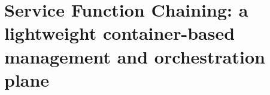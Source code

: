 \makeatletter
\newcommand{\unchapter}[1]{%
  \begingroup
  \let\@makechapterhead\@gobble %
  \chapter{#1}
  \endgroup
}
\makeatother

\unchapter{Service Function Chaining: a lightweight container-based management
and orchestration plane}

